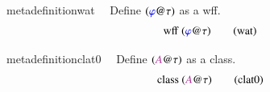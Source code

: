 \begin{restatable}{metadefinition}{wat}~~ Define $( \mw{\varphi} @ \tau )$ as a wff.
\begin{align}
\,\mathrm{wff}~ ( \mw{\varphi} @ \tau )\label{eq:wat}\tag{wat}
\end{align}
\end{restatable}

\begin{restatable}{metadefinition}{clat0}~~ Define $( \mc{A} @ \tau )$ as a class.
\begin{align}
\,\mathrm{class}~ ( \mc{A} @ \tau )\label{eq:clat0}\tag{clat0}
\end{align}
\end{restatable}

